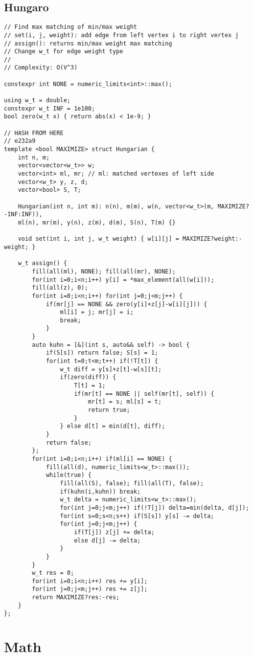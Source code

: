 \documentclass{article}
\begin{document}
\subsection{Hungaro}
\begin{verbatim}
// Find max matching of min/max weight
// set(i, j, weight): add edge from left vertex i to right vertex j 
// assign(): returns min/max weight max matching
// Change w_t for edge weight type
//
// Complexity: O(V^3)

constexpr int NONE = numeric_limits<int>::max();

using w_t = double;
constexpr w_t INF = 1e100;
bool zero(w_t x) { return abs(x) < 1e-9; }

// HASH FROM HERE
// e232a9
template <bool MAXIMIZE> struct Hungarian {
	int n, m;
	vector<vector<w_t>> w;
	vector<int> ml, mr; // ml: matched vertexes of left side
	vector<w_t> y, z, d;
	vector<bool> S, T;

	Hungarian(int n, int m): n(n), m(m), w(n, vector<w_t>(m, MAXIMIZE?-INF:INF)), 
	ml(n), mr(m), y(n), z(m), d(m), S(n), T(m) {}

	void set(int i, int j, w_t weight) { w[i][j] = MAXIMIZE?weight:-weight; }

	w_t assign() {
		fill(all(ml), NONE); fill(all(mr), NONE);
		for(int i=0;i<n;i++) y[i] = *max_element(all(w[i]));
		fill(all(z), 0);
		for(int i=0;i<n;i++) for(int j=0;j<m;j++) {
			if(mr[j] == NONE && zero(y[i]+z[j]-w[i][j])) {
				ml[i] = j; mr[j] = i;
				break;
			}
		}
		auto kuhn = [&](int s, auto&& self) -> bool {
			if(S[s]) return false; S[s] = 1;
			for(int t=0;t<m;t++) if(!T[t]) {
				w_t diff = y[s]+z[t]-w[s][t];
				if(zero(diff)) {
					T[t] = 1;
					if(mr[t] == NONE || self(mr[t], self)) {
						mr[t] = s; ml[s] = t;
						return true;
					}
				} else d[t] = min(d[t], diff);
			}
			return false;
		};
		for(int i=0;i<n;i++) if(ml[i] == NONE) {
			fill(all(d), numeric_limits<w_t>::max());
			while(true) {
				fill(all(S), false); fill(all(T), false);
				if(kuhn(i,kuhn)) break;
				w_t delta = numeric_limits<w_t>::max();
				for(int j=0;j<m;j++) if(!T[j]) delta=min(delta, d[j]);
				for(int s=0;s<n;s++) if(S[s]) y[s] -= delta;
				for(int j=0;j<m;j++) {
					if(T[j]) z[j] += delta;
					else d[j] -= delta;
				}
			}
		}
		w_t res = 0;
		for(int i=0;i<n;i++) res += y[i];
		for(int j=0;j<m;j++) res += z[j];
		return MAXIMIZE?res:-res;
	}
};
\end{verbatim}
\section{Math}
\end{document}
